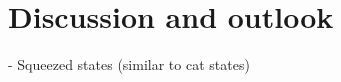 \chapter{Discussion and outlook}\label{cha:discussion-outlook}

- Squeezed states (similar to cat states) \cite{Pedernales_2023}